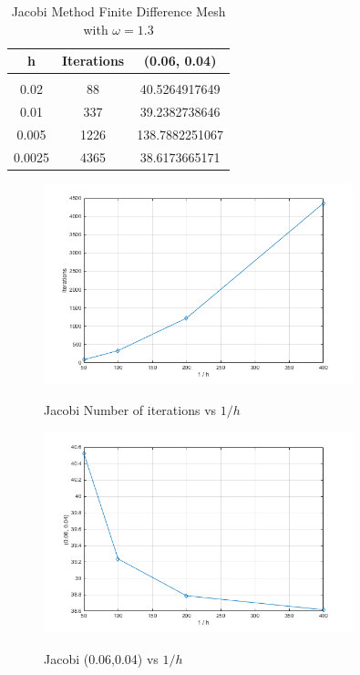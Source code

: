 \documentclass[11pt]{amsart}
\begin{document}
\begin{table}[h!]
    \caption{Jacobi Method Finite Difference Mesh with $\omega =1.3$}
    \label{tbl:fdm_mesh_3}
    \begin{tabular}{ c | c | c}
    	\textbf{h} & \textbf{Iterations} & \textbf{(0.06, 0.04)}\\ \hline \\
	0.02 & 88 & 40.5264917649\\
	0.01 & 337 & 39.2382738646\\
	0.005 & 1226 &138.7882251067\\
	0.0025 & 4365 & 38.6173665171
    \end{tabular}
\end{table}
\begin{center}
	\begin{figure}[h]
		\caption{Jacobi Number of iterations vs $1 / h$}
		\includegraphics[width=0.8\textwidth]{assets/J_itr_v_1_o_h.png}\label{fig:J_itr_vs_1_o_h}
	\end{figure}
\end{center}
\begin{center}
	\begin{figure}[h]
		\caption{Jacobi (0.06,0.04) vs $1 / h$}
		\includegraphics[width=0.8\textwidth]{assets/J_point_v_1_o_h.png}\label{fig:J_point_vs_1_o_h}
	\end{figure}
\end{center}
\end{document}

